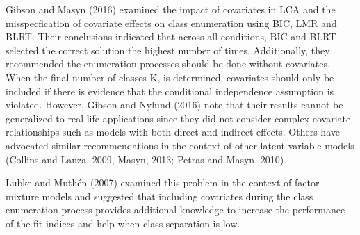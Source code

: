 Gibson and Masyn (2016) examined the impact of covariates in LCA and the misspecfication of covariate effects on class enumeration using BIC, LMR and BLRT. Their conclusions indicated that across all conditions, BIC and BLRT selected the correct solution the highest number of times. Additionally, they recommended the enumeration processes should be done without covariates. When the final number of classes K, is determined, covariates should only be included if there is evidence that the conditional independence assumption is violated. However, Gibson and Nylund (2016) note that their results cannot be generalized to real life applications since they did not consider complex covariate relationships such as models with both direct and indirect effects.  Others have advocated similar recommendations in the context of other latent variable models  (Collins and Lanza, 2009, Masyn, 2013; Petras and Masyn, 2010). 

Lubke and Muth\'en (2007) examined this problem in the context of factor mixture models and suggested that including covariates during the class enumeration process provides additional knowledge to increase the performance of the fit indices and help when class separation is low. 

